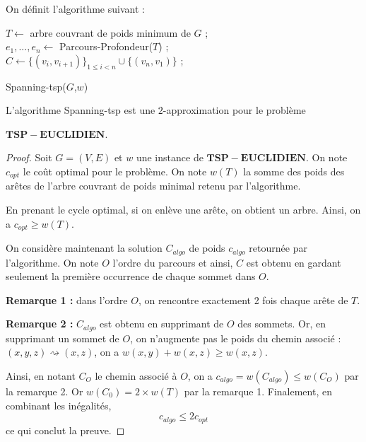 On définit l'algorithme suivant :

\begin{algorithm}
$T \leftarrow$ arbre couvrant de poids minimum de $G$ ;\\
$e_1,...,e_n \leftarrow$ Parcours-Profondeur($T$) ;\\
$C\leftarrow \{(v_i,v_{i+1})\}_{1\leq i <n} \cup \{(v_n,v_1)\}$ ;\\
\caption{Spanning-tsp($G$,$w$)}
\end{algorithm}

\begin{theorem}
L'algorithme Spanning-tsp est une $2$-approximation pour le problème

$\mathbf{TSP-EUCLIDIEN}$.
\end{theorem}

\begin{proof} Soit $G=(V,E)$ et $w$ une instance de $\mathbf{TSP-EUCLIDIEN}$. On note $c_{opt}$ le coût optimal pour le problème. On note $w(T)$ la somme des poids des arêtes de l'arbre couvrant de poids minimal retenu par l'algorithme.

En prenant le cycle optimal, si on enlève une arête, on obtient un arbre. Ainsi, on a $c_{opt} \geq w(T)$.

On considère maintenant la solution $C_{algo}$ de poids $c_{algo}$ retournée par l'algorithme. On note $O$ l'ordre du parcours et ainsi, $C$ est obtenu en gardant seulement la première occurrence de chaque sommet dans $O$.

\noindent \textbf{Remarque 1 :} dans l'ordre $O$, on rencontre exactement 2 fois chaque arête de $T$.

\noindent \textbf{Remarque 2 :} $C_{algo}$ est obtenu en supprimant de $O$ des sommets. Or, en supprimant un sommet de $O$, on n'augmente pas le poids du chemin associé : $(x,y,z) \rightsquigarrow (x,z)$, on a $w(x,y)+w(x,z) \geq w(x,z)$. 


Ainsi, en notant $C_O$ le chemin associé à $O$, on a $c_{algo}=w(C_{algo}) \leq w(C_O)$ par la remarque 2. Or $w(C_0) = 2 \times w(T)$ par la remarque 1. Finalement, en combinant les inégalités, 
$$
c_{algo} \leq 2c_{opt}
$$
ce qui conclut la preuve.
\end{proof}
